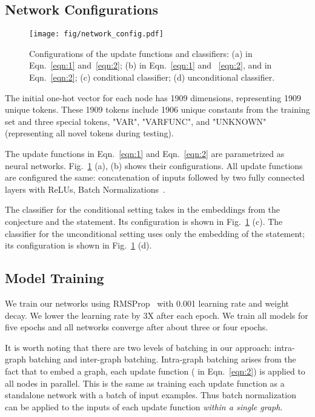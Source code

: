 \documentclass{article}
\begin{document}
\subsection{Network Configurations}\label{config}

\begin{figure}
	\centering
	\texttt{[image: fig/network\_config.pdf]}
	\caption{Configurations of the update functions and classifiers: (a)  in  Eqn.~\ref{eqn:1} and~\ref{eqn:2}; (b)  in Eqn.~\ref{eqn:1} and ~\ref{eqn:2}, and  in  Eqn.~\ref{eqn:2}; (c) conditional classifier; (d) unconditional classifier.}
	\label{fig:network_config}
	\vspace{-4mm}
\end{figure}

\label{sec:network_config}
The initial one-hot vector for each node has 1909 dimensions, representing
   1909 unique tokens. These 1909 tokens include 1906 unique
  constants from the training set and three special tokens, "VAR", "VARFUNC", and
  "UNKNOWN" (representing all novel tokens during testing). 

The update functions in Eqn.~\ref{eqn:1} and Eqn.~\ref{eqn:2} are parametrized as neural
networks. Fig.~\ref{fig:network_config} (a), (b) shows their configurations. All update functions are
configured the same: concatenation of inputs followed by two fully connected layers with
ReLUs, Batch Normalizations~\cite{ioffe2015batch}.  

The classifier for the conditional setting takes in the embeddings from the conjecture
and the statement. Its configuration is shown in Fig.~\ref{fig:network_config} (c). The classifier for
the unconditional setting uses only the embedding of the statement; its configuration is
shown in Fig.~\ref{fig:network_config} (d). 

\subsection{Model Training}

We train our networks using RMSProp~\cite{hinton2012lecture} with 0.001 learning rate and
 weight decay. We lower the learning rate by 3X after each epoch. We train all
models for five epochs and all networks converge after about three or four epochs. 

It is worth noting that there are two levels of batching in our approach: intra-graph
batching and inter-graph batching. Intra-graph batching arises from the fact that to embed
a graph, each update function ( in Eqn.~\ref{eqn:2}) is applied to all nodes in
parallel. This is the same as training each update function as a standalone network with a
batch of input examples. Thus batch normalization can be applied to the
inputs of each update function \emph{within a single graph}. 
\end{document}
